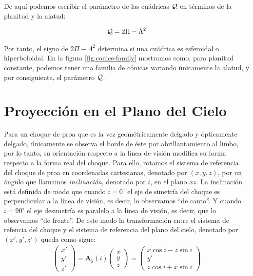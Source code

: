 De aquí podemos escribir el parámetro de las cuádricas $\mathcal{Q}$ en términos de la planitud y la alatud:

\begin{align}
  \mathcal{Q} = 2\Pi - \Lambda^2 \label{eq:quadric-parameter-pi-lambda}
\end{align}

Por tanto, el signo de $2\Pi - \Lambda^2$ determina si una cuádrica es esferoidal o hiperboloidal. En la figura \ref{fig:conics-family} mostramos como, para planitud constante, podemos tener una familia de cónicas variando únicamente la alatud, y por consiguiente, el parámetro $\mathcal{Q}$.

\section{Proyección en el Plano del Cielo}
\label{sec:projection}

Para un choque de proa que es la vez geométricamente delgado y ópticamente delgado, únicamente se observa el borde de éste por
abrillantamiento al limbo, por lo tanto, su orientación respecto a la línea de visión modifica su forma respecto a la forma real del
choque. Para ello, rotamos el sistema de referencia del choque de proa en coordenadas cartesianas, denotado por $(x, y, z)$, por un ángulo que llamamos \textit{inclinación}, denotado por $i$, en el plano $xz$. La inclinación está definida de modo que cuando $i=0^\circ$ el eje de simetría del choque es perpendicular a la línea de visión, es decir, lo observamos ``de canto''. Y cuando $i = 90^\circ$ el eje desimetría es paralelo a la línea de visión, es decir, que lo observamos ``de frente''. De este modo la transformación entre el sistema de refencia del choque y el sistema de referencia del plano del cielo, denotado por $(x', y', z')$ queda como sigue:
\begin{align}
  \left(
  \begin{array}{c}
    x' \\ y' \\ z'
  \end{array}
  \right) = \mathbf{A}_y(i)
  \left(
  \begin{array}{c}
    x \\ y \\ z
  \end{array}
  \right) =
  \left(
  \begin{array}{c}
    x\cos i - z\sin i \\ y' \\ z\cos i + x\sin i
  \end{array}
  \right)
  \label{eq:rotation}
\end{align}

